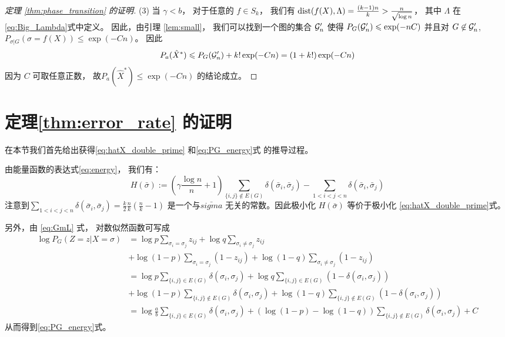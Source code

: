 \begin{proof}[定理 \ref{thm:phase_transition} 的证明]
	(3) 当 $\gamma < b$，
  对于任意的 $f\in S_k$，
  我们有
  $\operatorname{dist}(f(X), \Lambda) = \frac{(k-1)n}{k} > \frac{n}{\sqrt{\log n}}$，
  其中 $\Lambda$ 在\eqref{eq:Big_Lambda}式中定义。
	因此，由引理 \ref{lem:small}，
  我们可以找到一个图的集合 $\mathcal{G}'_n$
  使得 $P_G(\mathcal{G}'_n) \leqslant \exp(-nC)$
	并且对 $G\not \in \mathcal{G}'_n$, $P_{\sigma |G}(\sigma = f(X)) \leq \exp(-Cn)$。
  因此
	\begin{align*}
	P_a(\hat{X}^*) \leqslant P_G(\mathcal{G}'_n) + k! \exp(-Cn) = (1+k!)\exp(-Cn)
	\end{align*}
	因为 $C$
  可取任意正数，
	故$P_a(\hat{X}^*) \leq \exp(-Cn)$
  的结论成立。
\end{proof}
\section{定理\ref{thm:error_rate} 的证明}
在本节我们首先给出获得\eqref{eq:hatX_double_prime}
和\eqref{eq:PG_energy}式 的推导过程。

由能量函数的表达式\eqref{eq:energy}，
我们有：
\begin{equation}
	H(\bar{\sigma}) := (\gamma \frac{\log n}{n} + 1)\sum_{\{i,j\}\not\in E(G)} \delta(\bar{\sigma}_i, \bar{\sigma}_j)
	- \sum_{1<i<j<n} \delta(\bar{\sigma}_i, \bar{\sigma}_j)
\end{equation}
注意到$\sum_{1<i<j<n} \delta(\bar{\sigma}_i, \bar{\sigma}_j)=\frac{k}{2}\frac{n}{k}(\frac{n}{k}-1)$
是一个与$\bar{sigma}$ 无关的常数。因此极小化
$H(\bar{\sigma}) $ 等价于极小化
\eqref{eq:hatX_double_prime}式。

另外，由 \eqref{eq:GmL} 式，
对数似然函数可写成
\begin{align*}
  \log P_G(Z=z|X=\sigma)
  &= \log p \sum_{\sigma_i = \sigma_j} z_{ij}
  +\log q \sum_{\sigma_i \neq \sigma_j}z_{ij}\\
  &+\log (1-p) \sum_{\sigma_i = \sigma_j}(1-z_{ij})
  +\log (1-q) \sum_{\sigma_i \neq \sigma_j}(1-z_{ij})\\
  &= \log p \sum_{\{i,j\}\in E(G)}
  \delta(\sigma_i, \sigma_j)
  +\log q \sum_{\{i,j\}\in E(G)}(1-\delta(\sigma_i, \sigma_j))\\
  &+\log (1-p) \sum_{\{i,j\}\not\in E(G)}
  \delta(\sigma_i, \sigma_j)
  +\log (1-q) \sum_{\{i,j\}\not\in E(G)}
  (1-\delta(\sigma_i, \sigma_j))\\
  &=\log \frac{a}{b} \sum_{\{i,j\}\in E(G)}
  \delta(\sigma_i, \sigma_j) + (\log(1-p)-\log(1-q))
  \sum_{\{i,j\}\not \in E(G)}
  \delta(\sigma_i, \sigma_j)+ C
\end{align*}
从而得到\eqref{eq:PG_energy}式。


